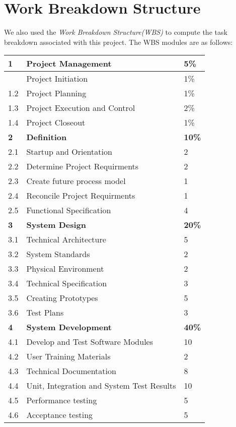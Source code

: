 \section{Work Breakdown Structure}
We also used the \emph{Work Breakdown Structure(WBS)} to compute the task breakdown associated with this project. The WBS modules are as follows: \newline
\begin{table}[h]
\begin{tabular}{|p{1cm}|p{10cm}|p{1cm}|}
\hline
\textbf{1} 	& \textbf{Project Management} & \textbf{5\%} \\ \hline
\indent 1.1	& Project Initiation & 1\% \\
1.2	& Project Planning & 1\% \\
1.3	& Project Execution and Control & 2\% \\
1.4	& Project Closeout & 1\% \\ \hline
\textbf{2}	& \textbf{Definition} & \textbf{10\%} \\ \hline
2.1	& Startup and Orientation & 2 \\
2.2	& Determine Project Requirments & 2 \\
2.3	& Create future process model & 1 \\
2.4	& Reconcile Project Requirments & 1 \\
2.5	& Functional Specification & 4 \\ \hline
\textbf{3}	& \textbf{System Design} & \textbf{20\%} \\ \hline
3.1	& Technical Architecture  & 5 \\ 
3.2	& System Standards & 2 \\ 
3.3	& Physical Environment & 2 \\ 
3.4	& Technical Specification & 3 \\ 
3.5	& Creating Prototypes & 5 \\ 
3.6	& Test Plans & 3 \\ \hline
\textbf{4}	& \textbf{System Development} & \textbf{40\%} \\ \hline
4.1	& Develop and Test Software Modules & 10 \\ 
4.2	& User Training Materials & 2 \\ 
4.3	& Technical Documentation & 8 \\ 
4.4	& Unit, Integration and System Test Results & 10 \\ 
4.5	& Performance testing & 5 \\ 
4.6	& Acceptance testing & 5 \\ \hline

\end{tabular}
\end{table}
